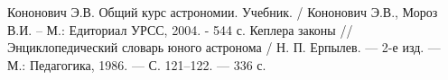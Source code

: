 
\nocite{*}

\begin{thebibliography}{}
     Кононович Э.В. Общий курс астрономии. Учебник. / Кононович Э.В.,
    Мороз В.И. – М.: Едиториал УРСС, 2004. - 544 с.
     Кеплера законы // Энциклопедический словарь юного астронома / Н. П. Ерпылев. — 2-е изд. — М.: Педагогика, 1986. — С. 121–122. — 336 с.
\end{thebibliography}

